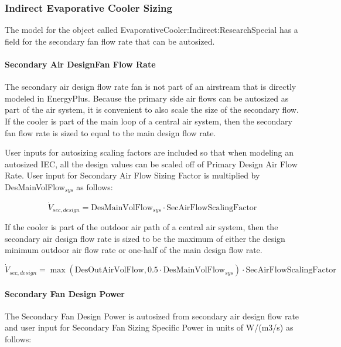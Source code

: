 \subsubsection{Indirect Evaporative Cooler Sizing}\label{indirect-evaporative-cooler-sizing-000}

The model for the object called EvaporativeCooler:Indirect:ResearchSpecial has a field for the secondary fan flow rate that can be autosized.

\paragraph{Secondary Air DesignFan Flow Rate}\label{secondary-air-designfan-flow-rate}

The secondary air design flow rate fan is not part of an airstream that is directly modeled in EnergyPlus. Because the primary side air flows can be autosized as part of the air system, it is convenient to also scale the size of the secondary flow. If the cooler is part of the main loop of a central air system, then the secondary fan flow rate is sized to equal to the main design flow rate.

User inputs for autosizing scaling factors are included so that when modeling an autosized IEC, all the design values can be scaled off of Primary Design Air Flow Rate. User input for Secondary Air Flow Sizing Factor is multiplied by DesMainVolFlow\(_{sys}\) as follows:

\begin{equation}
\dot{V}_{sec,design} = \text{DesMainVolFlow}_{sys}\cdot\text{SecAirFlowScalingFactor}
\end{equation}

If the cooler is part of the outdoor air path of a central air system, then the secondary air design flow rate is sized to be the maximum of either the design minimum outdoor air flow rate or one-half of the main design flow rate.

\begin{equation}
\dot{V}_{sec,design} = \max\left(\text{DesOutAirVolFlow},0.5\cdot\text{DesMainVolFlow}_{sys}\right)\cdot\text{SecAirFlowScalingFactor}
\end{equation}

\paragraph{Secondary Fan Design Power}\label{secondary-fan-design-power}

The Secondary Fan Design Power is autosized from secondary air design flow rate and user input for Secondary Fan Sizing Specific Power in units of W/(m3/s) as follows:

